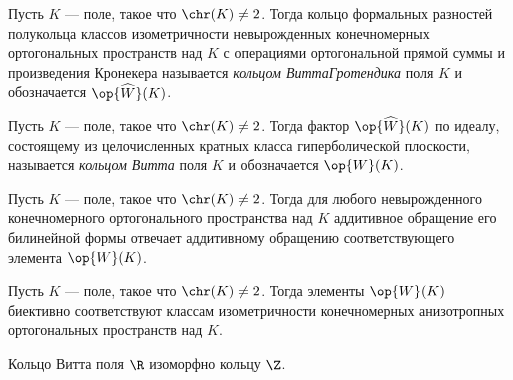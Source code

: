 \documentclass[
	extrafontsizes,
	11pt,
	hyphens,
]{memoir}
\begin{document}
\begin{definition}
Пусть \(K\) --- поле, такое что \(\chr(K) \neq 2\).
Тогда кольцо формальных разностей полукольца классов изометричности невырожденных конечномерных ортогональных пространств над \(K\) с операциями ортогональной прямой суммы и произведения Кронекера называется \emph{кольцом Витта\namedash{}Гротендика} поля \(K\) и обозначается \(\op{\widehat{W}}(K)\).
\end{definition}

\begin{definition}
Пусть \(K\) --- поле, такое что \(\chr(K) \neq 2\).
Тогда фактор \(\op{\widehat{W}}(K)\) по идеалу, состоящему из целочисленных кратных класса гиперболической плоскости, называется \emph{кольцом Витта} поля \(K\) и обозначается \(\op{W}(K)\).
\end{definition}

\begin{observation}
Пусть \(K\) --- поле, такое что \(\chr(K) \neq 2\).
Тогда для любого невырожденного конечномерного ортогонального пространства над \(K\) аддитивное обращение его билинейной формы отвечает аддитивному обращению соответствующего элемента \(\op{W}(K)\).
\end{observation}

\begin{observation}
Пусть \(K\) --- поле, такое что \(\chr(K) \neq 2\).
Тогда элементы \(\op{W}(K)\) биективно соответствуют классам изометричности конечномерных анизотропных ортогональных пространств над \(K\).
\end{observation}

\begin{example}
Кольцо Витта поля \(\R\) изоморфно кольцу \(\Z\).
\end{example}
\end{document}
